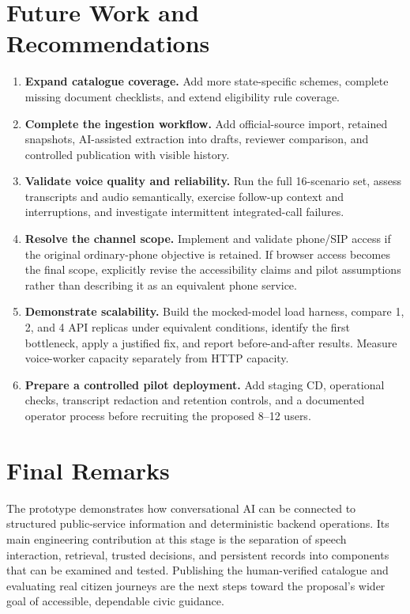 \documentclass[11pt,a4paper,oneside]{report}
\begin{document}
\section{Future Work and Recommendations}
\begin{enumerate}
  \item \textbf{Expand catalogue coverage.} Add more state-specific schemes,
    complete missing document checklists, and extend eligibility rule coverage.
  \item \textbf{Complete the ingestion workflow.} Add official-source import,
    retained snapshots, AI-assisted extraction into drafts, reviewer comparison,
    and controlled publication with visible history.
  \item \textbf{Validate voice quality and reliability.} Run the full 16-scenario
    set, assess transcripts and audio semantically, exercise follow-up context
    and interruptions, and investigate intermittent integrated-call failures.
  \item \textbf{Resolve the channel scope.} Implement and validate phone/SIP
    access if the original ordinary-phone objective is retained. If browser access
    becomes the final scope, explicitly revise the accessibility claims and pilot
    assumptions rather than describing it as an equivalent phone service.
  \item \textbf{Demonstrate scalability.} Build the mocked-model load harness,
    compare 1, 2, and 4 API replicas under equivalent conditions, identify the
    first bottleneck, apply a justified fix, and report before-and-after results.
    Measure voice-worker capacity separately from HTTP capacity.
  \item \textbf{Prepare a controlled pilot deployment.} Add staging CD,
    operational checks, transcript redaction and retention controls, and a
    documented operator process before recruiting the proposed 8--12 users.
\end{enumerate}

\section{Final Remarks}
The prototype demonstrates how conversational AI can be connected to structured
public-service information and deterministic backend operations. Its main
engineering contribution at this stage is the separation of speech interaction,
retrieval, trusted decisions, and persistent records into components that can be
examined and tested. Publishing the human-verified catalogue and evaluating real
citizen journeys are the next steps toward the proposal's wider goal of accessible,
dependable civic guidance.
\end{document}
